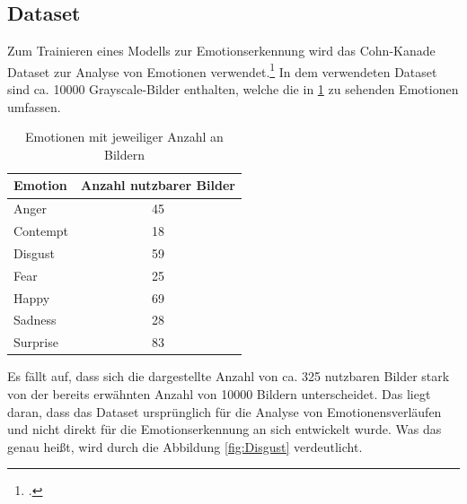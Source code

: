\documentclass[12pt, a4paper]{report}
\begin{document}
\subsection{Dataset}
Zum Trainieren eines Modells zur Emotionserkennung wird das Cohn-Kanade Dataset zur Analyse von Emotionen verwendet.\footcite[Vgl.][]{CK} In dem verwendeten Dataset sind ca. 10000 Grayscale-Bilder enthalten, welche die in \ref{tab:ckemotions} zu sehenden Emotionen umfassen.
\begin{table}[h]
\centering
\begin{tabular}[t]{l|c}
Emotion & Anzahl nutzbarer Bilder \\
\hline
Anger & 45 \\
Contempt & 18 \\
Disgust & 59 \\
Fear & 25 \\
Happy & 69 \\
Sadness & 28 \\
Surprise & 83 \\
\hline
\end{tabular}
\caption{Emotionen mit jeweiliger Anzahl an Bildern}
\label{tab:ckemotions}
\end{table}
Es fällt auf, dass sich die dargestellte Anzahl von ca. 325 nutzbaren Bilder stark von der bereits erwähnten Anzahl von 10000 Bildern unterscheidet. Das liegt daran, dass das Dataset ursprünglich für die Analyse von Emotionensverläufen und nicht direkt für die Emotionserkennung an sich entwickelt wurde. Was das genau heißt, wird durch die Abbildung \ref{fig:Disgust} verdeutlicht.
\end{document}
